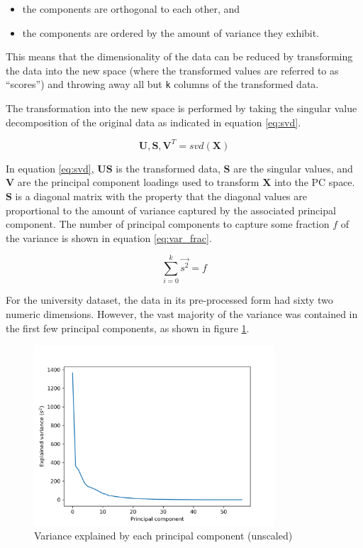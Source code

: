 \documentclass{article}
\begin{document}
	\begin{itemize}
		\item the components are orthogonal to each other, and
		\item the components are ordered by the amount of variance they exhibit.
	\end{itemize}
	
	This means that the dimensionality of the data can be reduced by transforming the data into the 
	new space (where the transformed values are referred to as ``scores'') and throwing away all but 
	\texttt{k} columns of the transformed data. 
	
	The transformation into the new space is performed by taking the singular value decomposition of 
	the original data as indicated in equation \ref{eq:svd}. 
	
	\begin{equation}
		\mathbf{U}, \mathbf{S}, \mathbf{V}^T = svd(\mathbf{X})
		\label{eq:svd}
	\end{equation}
	
	In equation \ref{eq:svd}, $\mathbf{US}$ is the transformed data, $\mathbf{S}$ are the singular 
	values, and $\mathbf{V}$ are the principal component loadings used to transform $\mathbf{X}$ into 
	the PC space. $\mathbf{S}$ is a diagonal matrix with the property that the diagonal values are 
	proportional to the amount of variance captured by the associated principal component. The number 
	of principal components to capture some fraction $f$ of the variance is shown in equation 
	\ref{eq:var_frac}.
	
	\begin{equation}
		\sum_{i=0}^k \vec{s^2} = f
		\label{eq:var_frac}
	\end{equation}
	
	For the university dataset, the data in its pre-processed form had sixty two numeric dimensions. 
	However, the vast majority of the variance was contained in the first few principal components, as 
	shown in figure \ref{fig:explained_variance}.
	
	\begin{figure}[h]
		\centering
		\includegraphics[width=0.8\textwidth]{explained_variance}
		\caption{Variance explained by each principal component (unscaled)}
		\label{fig:explained_variance}
	\end{figure}
	
\end{document}
